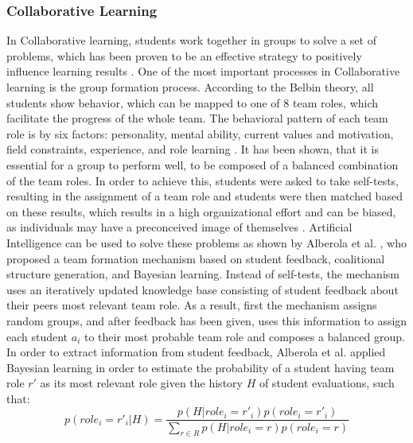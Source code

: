 \documentclass{Academic}
\begin{document}
    \subsubsection{Collaborative Learning}
    In Collaborative learning, students work together in groups to solve a set of problems, which has been proven to be an effective strategy to positively influence learning results \cite{holmes_artificial_2023}. One of the most important processes in Collaborative learning is the group formation process. According to the Belbin theory, all students show behavior, which can be mapped to one of 8 team roles, which facilitate the progress of the whole team. The behavioral pattern of each team role is by six factors: personality, mental ability, current values and motivation, field constraints, experience, and role learning \cite{alberola_artificial_2016}. It has been shown, that it is essential for a group to perform well, to be composed of a balanced combination of the team roles. In order to achieve this, students were asked to take self-tests, resulting in the assignment of a team role and students were then matched based on these results, which results in a high organizational effort and can be biased, as individuals may have a preconceived image of themselves \cite{alberola_artificial_2016}. Artificial Intelligence can be used to solve these problems as shown by Alberola et al. \cite{alberola_artificial_2016}, who proposed a team formation mechanism based on student feedback, coalitional structure generation, and Bayesian learning. Instead of self-tests, the mechanism uses an iteratively updated knowledge base consisting of student feedback about their peers most relevant team role. As a result, first the mechanism assigns random groups, and after feedback has been given, uses this information to assign each student $a_i$ to their most probable team role and composes a balanced group. In order to extract information from student feedback, Alberola et al. \cite{alberola_artificial_2016} applied Bayesian learning in order to estimate the probability of a student having team role $r'$ as its most relevant role given the history $H$ of student evaluations, such that:
    \begin{equation}
        p(role_i = r'_i|H) = \frac{p(H|role_i = r'_i)p(role_i=r'_i)}{\sum_{r \in R} p(H|role_i = r)p(role_i=r)}
    \end{equation}
\end{document}
